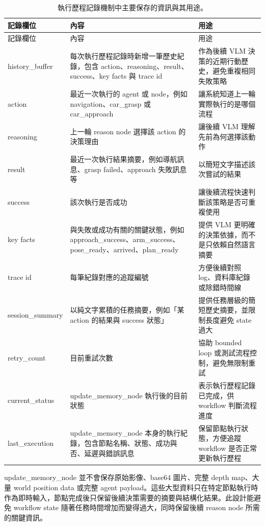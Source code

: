 \documentclass[12pt,a4paper]{article}
\begin{document}
\begingroup
\scriptsize
\setlength{\tabcolsep}{2pt}
\begin{longtable}{@{}P{0.22\textwidth}P{0.42\textwidth}P{0.30\textwidth}@{}}
\caption{執行歷程記錄機制中主要保存的資訊與其用途。}\label{tab:memory_fields}\\
\toprule
記錄欄位 & 內容 & 用途 \\
\midrule
\endfirsthead
\toprule
記錄欄位 & 內容 & 用途 \\
\midrule
\endhead
history\_buffer & 每次執行歷程記錄時新增一筆歷史紀錄，包含 action、reasoning、result、success、key facts 與 trace id & 作為後續 VLM 決策的近期行動歷史，避免重複相同失敗策略 \\
action & 最近一次執行的 agent 或 node，例如 navigation、car\_grasp 或 car\_approach & 讓系統知道上一輪實際執行的是哪個流程 \\
reasoning & 上一輪 reason node 選擇該 action 的決策理由 & 讓後續 VLM 理解先前為何選擇該動作 \\
result & 最近一次執行結果摘要，例如導航訊息、grasp failed、approach 失敗訊息等 & 以簡短文字描述該次嘗試的結果 \\
success & 該次執行是否成功 & 讓後續流程快速判斷該策略是否可重複使用 \\
key facts & 與失敗或成功有關的關鍵狀態，例如 approach\_success、arm\_success、pose\_ready、arrived、plan\_ready & 提供 VLM 更明確的決策依據，而不是只依賴自然語言摘要 \\
trace id & 每筆紀錄對應的追蹤編號 & 方便後續對照 log、資料庫紀錄或除錯時間線 \\
session\_summary & 以純文字累積的任務摘要，例如「某 action 的結果與 success 狀態」 & 提供任務層級的簡短歷史摘要，並限制長度避免 state 過大 \\
retry\_count & 目前重試次數 & 協助 bounded loop 或測試流程控制，避免無限制重試 \\
current\_status & update\_memory\_node 執行後的目前狀態 & 表示執行歷程記錄已完成，供 workflow 判斷流程進度 \\
last\_execution & update\_memory\_node 本身的執行紀錄，包含節點名稱、狀態、成功與否、延遲與錯誤訊息 & 保留節點執行狀態，方便追蹤 workflow 是否正常更新執行歷程 \\
\bottomrule
\end{longtable}
\endgroup

update\_memory\_node 並不會保存原始影像、base64 圖片、完整 depth map、大量 world position data 或完整 agent payload。這些大型資料只在特定節點執行時作為即時輸入，節點完成後只保留後續決策需要的摘要與結構化結果。此設計能避免 workflow state 隨著任務時間增加而變得過大，同時保留後續 reason node 所需的關鍵資訊。
\end{document}
